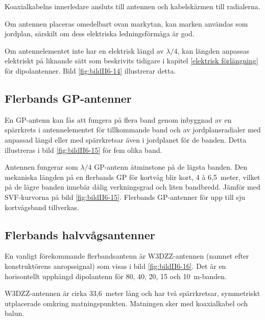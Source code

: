 Koaxialkabelns innerledare ansluts till antennen och kabelskärmen till
radialerna.

Om antennen placeras omedelbart ovan markytan, kan marken användas som
jordplan, särskilt om dess elektriska ledningsförmåga är god.

Om antennelementet inte har en elektrisk längd av \(\lambda/4\), kan
längden anpassas elektriskt på liknande sätt som beskrivits tidigare i
kapitel \ref{elektrisk förlängning} för dipolantenner.
Bild \ref{fig:bildII6-14} illustrerar detta.


\subsection{Flerbands GP-antenner}

En GP-antenn kan fås att fungera på flera band genom inbyggnad av en spärrkrets
i antennelementet för tillkommande band och av jordplansradialer med anpassad
längd eller med spärrkretsar även i jordplanet för de banden.
Detta illustreras i bild \ref{fig:bildII6-15} för fem olika band.

Antennen fungerar som \(\lambda/4\) GP-antenn åtminstone på de lägsta banden.
Den mekaniska längden på en flerbands GP för kortvåg blir kort, 4 à 6,5~meter,
vilket på de lägre banden innebär dålig verkningsgrad och liten bandbredd.
Jämför med SVF-kurvorna på bild \ref{fig:bildII6-15}.
Flerbands GP-antenner för upp till sju kortvågsband tillverkas.


\subsection{Flerbands halvvågsantenner}
\label{W3DZZ}

En vanligt förekommande flerbandsantenn är W3DZZ-antennen (namnet
efter konstruktörens anropssignal) som visas i bild \ref{fig:bildII6-16}.
Det är en horisontellt upphängd dipolantenn för 80, 40, 20, 15 och
10~m-banden.

W3DZZ-antennen är cirka 33,6~meter lång och har två spärrkretsar,
symmetriskt utplacerade omkring matningspunkten.
Matningen sker med koaxialkabel och balun.

